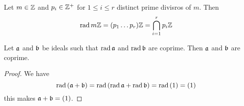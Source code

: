 \begin{example}\label{example_1.8}
    Let $m \in \Z$ and  $p_i \in \Z^+$ for $1 \leq i \leq r$ distinct prime
    divisros of $m$. Then
    \begin{equation*}
        \rad{m\Z}=(p_1 \dots p_r)\Z=\bigcap_{i=1}^r{p_i\Z}
    \end{equation*}
\end{example}

\begin{lemma}\label{1.6.14}
    Let $\af$ and  $\bf$ be ideals such that  $\rad{\af}$ and $\rad{\bf}$ are
    coprime. Then $\af$ and  $\bf$ are coprime.
\end{lemma}
\begin{proof}
    We have
    \begin{equation*}
        \rad{(\af+\bf)}=\rad{(\rad{\af}+\rad{\bf})}=\rad{(1)}=(1)
    \end{equation*}
    this makes $\af+\bf=(1)$.
\end{proof}
